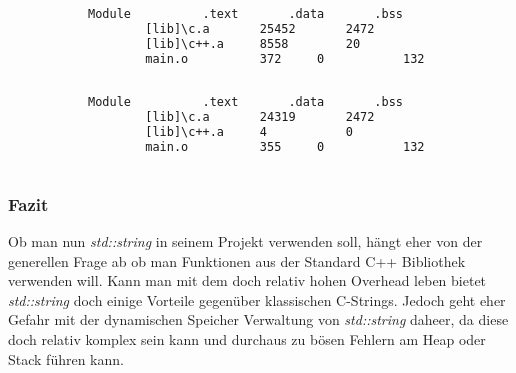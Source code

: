 \documentclass[MES,Master,ngerman]{twbook}%
\begin{document}
\begin{figure}[!htb]
	\begin{subfigure}[b]{0.5\textwidth}
		\begin{lstlisting}[gobble=6, title={std::string}, language=bash, numbers=none]
		Module 			.text		.data		.bss
		[lib]\c.a		25452		2472		11
		[lib]\c++.a		8558		20			204
		main.o			372		0			132
		
		\end{lstlisting}
	\end{subfigure}
	\begin{subfigure}[b]{0.5\textwidth}
		\begin{lstlisting}[gobble=6, title={C- Strings}, language=bash, numbers=none]
		Module 			.text		.data		.bss
		[lib]\c.a		24319		2472		89
		[lib]\c++.a		4			0			0
		main.o			355		0			132
		
		\end{lstlisting}
	\end{subfigure}
\end{figure}
\newpage
\subsubsection{Fazit}
Ob man nun \textit{std::string} in seinem Projekt verwenden soll, hängt eher von der generellen Frage ab ob man Funktionen aus der Standard C++ Bibliothek verwenden will. Kann man mit dem doch relativ hohen Overhead leben bietet \textit{std::string} doch einige Vorteile gegenüber klassischen C-Strings. Jedoch geht eher Gefahr mit der dynamischen Speicher Verwaltung von \textit{std::string} daheer, da diese doch relativ komplex sein kann und durchaus zu bösen Fehlern am Heap oder Stack führen kann.


\newpage
\end{document}
